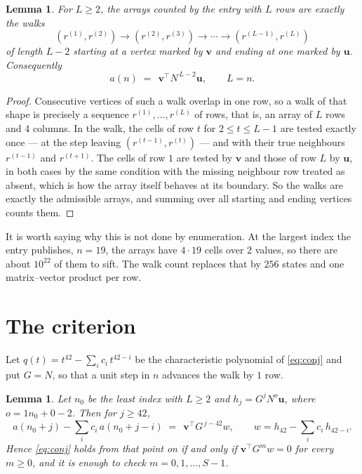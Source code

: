 \documentclass[11pt,a4paper]{article}
\theoremstyle{plain}
\newtheorem{lemma}[theorem]{Lemma}
\theoremstyle{definition}
\begin{document}
\begin{lemma}\label{lem:walk}
For $L\ge2$, the arrays counted by the entry with $L$ rows are exactly the walks
\[
(r^{(1)},r^{(2)})\to(r^{(2)},r^{(3)})\to\cdots\to(r^{(L-1)},r^{(L)})
\]
of length $L-2$ starting at a vertex marked by $\mathbf{v}$ and ending at one marked by
$\mathbf{u}$. Consequently
\[
a(n)\;=\;\,\mathbf{v}^{\!\top}N^{\,L-2}\mathbf{u},\qquad L=n .
\]
\end{lemma}

\begin{proof}
Consecutive vertices of such a walk overlap in one row, so a walk of that shape is
precisely a sequence $r^{(1)},\dots,r^{(L)}$ of rows, that is, an array of $L$ rows
and $4$ columns. In the walk, the cells of row $t$ for $2\le t\le L-1$ are tested
exactly once --- at the step leaving $(r^{(t-1)},r^{(t)})$ --- and with their true
neighbours $r^{(t-1)}$ and $r^{(t+1)}$. The cells of row $1$ are tested by
$\mathbf{v}$ and those of row $L$ by $\mathbf{u}$, in both cases by the same condition
with the missing neighbour row treated as absent, which is how the array itself behaves at
its boundary. So the walks are exactly the admissible arrays, and summing over all starting
and ending vertices counts them.
\end{proof}


It is worth saying why this is not done by enumeration. At the largest index the entry
publishes, $n=19$, the arrays have $4\cdot19$ cells over
$2$ values, so there are about $10^{22}$ of them to sift. The
walk count replaces that by $256$ states and one matrix--vector product per row.
\section{The criterion}

Let $q(t)=t^{42}-\sum_i c_i\,t^{42-i}$ be the characteristic polynomial of
\eqref{eq:conj} and put $G=N$, so that a unit step in $n$ advances the walk by
$1$ row.

\begin{lemma}\label{lem:crit}
Let $n_0$ be the least index with $L\ge2$ and $h_j=G^{j}N^{o}\mathbf{u}$, where
$o=1n_0+0-2$. Then for $j\ge42$,
\[
a(n_0+j)-\sum_i c_i\,a(n_0+j-i)\;=\;\,\mathbf{v}^{\!\top}G^{\,j-42}w,
\qquad w=h_{42}-\sum_i c_i\,h_{42-i} .
\]
Hence \eqref{eq:conj} holds from that point on if and only if
$\mathbf{v}^{\!\top}G^{m}w=0$ for every $m\ge0$, and it is enough to check
$m=0,1,\dots,S-1$.
\end{lemma}
\end{document}
